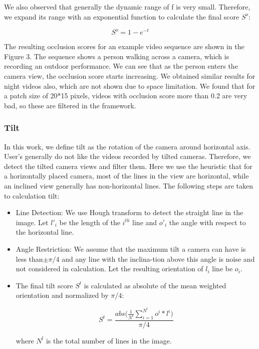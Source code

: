 \documentclass{sig-alternate}
\begin{document}
We also observed that generally the dynamic range of f is very small. Therefore, we expand its range with an exponential function to calculate the final score $S^o$:

\begin{displaymath}{S^o = 1- e^{-t}}\end{displaymath}


The resulting occlusion scores for an example video sequence are shown in the Figure 3. The sequence shows a person walking
across a camera, which is recording an outdoor performance. We
can see that as the person enters the camera view, the occlusion
score starts increasing. We obtained similar results for night videos
also, which are not shown due to space limitation. We found that
for a patch size of 20*15 pixels, videos with occlusion score more
than 0.2 are very bad, so these are filtered in the framework.
\subsubsection{Tilt}
In this work, we define tilt as the rotation of the camera around
horizontal axis. User’s generally do not like the videos recorded
by tilted cameras. Therefore, we detect the tilted camera views
and filter them. Here we use the heuristic that for a horizontally
placed camera, most of the lines in the view are horizontal, while
an inclined view generally has non-horizontal lines. The following
steps are taken to calculation tilt:

\begin{itemize}
    \item Line Detection: We use Hough transform to detect the straight line in the image. Let $l'_i$ be the length of the $i^{th}$ line and  $o'_i$ the angle with respect to the horizontal line.
    \item Angle Restriction: We assume that the maximum tilt a camera can have is less than$\pm \pi/4$  and any line with the inclina-tion above this angle is noise and not considered in calculation. Let the resulting orientation of $l_i$ line be $o_i$.
    \item The final tilt score $S^t$ is calculated as absolute of the mean weighted orientation and normalized by $\pi/4$:
    
    \begin{equation}
    S^t = \frac{abs \Big(\frac{1}{N^l} \sum_{i=1}^{N^l} o^i * l^i\Big)}{\pi/4}
\end{equation}


    
    
    
    where $N^l$ is the total number of lines in the image.

\end{itemize}
\end{document}
